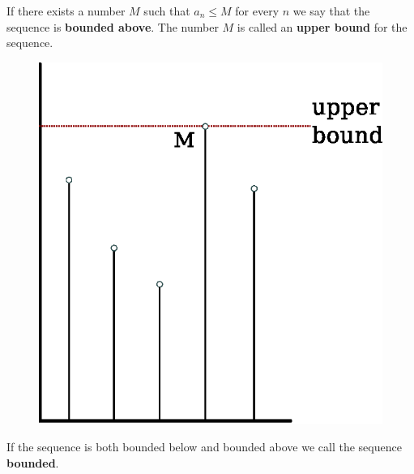 \begin{defn}
  If there exists a number $M$ such that $a_n \leq M$ for every $n$ we say that the sequence is \textbf{bounded above}.
  The number $M$ is called an \textbf{upper bound} for the sequence.
  \begin{figure}[h]
    \begin{center}
      \includegraphics[scale=0.5]{continuous/sequence/uprbnd}
    \end{center}
  \end{figure}
\end{defn}
\begin{defn}
  If the sequence is both bounded below and bounded above we call the sequence \textbf{bounded}.
\end{defn}
